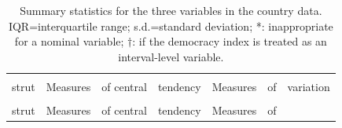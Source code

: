 \documentclass[11pt,a4paper,openany]{book}
\begin{document}
\begin{longtable}[]{@{}lrccccc@{}}
\caption{\label{tab:t-countries-sums} Summary statistics for the three
variables in the country data. IQR=interquartile range; s.d.=standard
deviation; *: inappropriate for a nominal variable; \(\dagger\): if the
democracy index is treated as an interval-level
variable.}\tabularnewline
\toprule
\begin{minipage}[b]{0.12\columnwidth}\raggedright\strut
\\strut
\end{minipage} & \begin{minipage}[b]{0.11\columnwidth}\raggedleft\strut
Measures\strut
\end{minipage} & \begin{minipage}[b]{0.23\columnwidth}\centering\strut
of central\strut
\end{minipage} & \begin{minipage}[b]{0.09\columnwidth}\centering\strut
tendency\strut
\end{minipage} & \begin{minipage}[b]{0.09\columnwidth}\centering\strut
Measures\strut
\end{minipage} & \begin{minipage}[b]{0.08\columnwidth}\centering\strut
of\strut
\end{minipage} & \begin{minipage}[b]{0.09\columnwidth}\centering\strut
variation\strut
\end{minipage}\tabularnewline
\midrule
\endfirsthead
\toprule
\begin{minipage}[b]{0.12\columnwidth}\raggedright\strut
\\strut
\end{minipage} & \begin{minipage}[b]{0.11\columnwidth}\raggedleft\strut
Measures\strut
\end{minipage} & \begin{minipage}[b]{0.23\columnwidth}\centering\strut
of central\strut
\end{minipage} & \begin{minipage}[b]{0.09\columnwidth}\centering\strut
tendency\strut
\end{minipage} & \begin{minipage}[b]{0.09\columnwidth}\centering\strut
Measures\strut
\end{minipage} & \begin{minipage}[b]{0.08\columnwidth}\centering\strut
of\strut
\end{minipage} & \begin{minipage}[b]{0.09\columnwidth}\centering\strut

\end{minipage}
\end{longtable}
\end{document}

